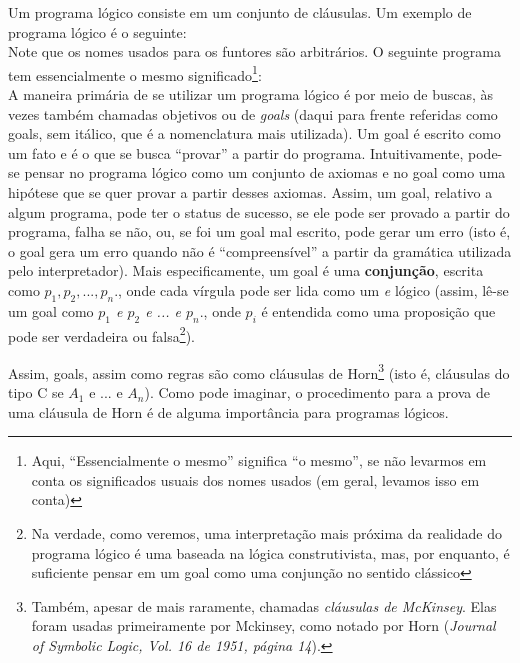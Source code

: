 \documentclass{article}
\theoremstyle{remark}
\begin{document}
Um programa lógico consiste em um conjunto de cláusulas. Um exemplo de programa lógico é o seguinte:\\



Note que os nomes usados para os funtores são arbitrários. O seguinte programa tem essencialmente o mesmo significado\footnote{ Aqui, ``Essencialmente o mesmo'' significa ``o mesmo'', se não levarmos em conta os significados usuais dos nomes usados (em geral, levamos isso em conta)}:\\




A maneira primária de se utilizar um programa lógico é por meio de buscas, às vezes também chamadas objetivos ou de \textit{goals} (daqui para frente referidas como goals, sem itálico, que é a nomenclatura mais utilizada). Um goal é escrito como um fato e é o que se busca ``provar'' a partir do programa. Intuitivamente, pode-se pensar no programa lógico como um conjunto de axiomas e no goal como uma hipótese que se quer provar a partir desses axiomas. Assim, um
goal, relativo a algum programa, pode ter o status de sucesso, se ele pode ser provado a partir do programa, falha se não, ou, se foi um goal mal escrito, pode gerar um erro (isto é, o goal gera um erro quando não é ``compreensível'' a partir da gramática utilizada pelo interpretador). Mais especificamente, um goal é uma \textbf{conjunção}, escrita como \textit{$p_1,p_2,...,p_n.$}, onde cada vírgula pode ser lida como um \textit{e} lógico (assim, lê-se um goal como \textit{$p_1$ e $p_2$ e ... e
  $p_n.$}, onde $p_i$ é
entendida como uma proposição que pode ser verdadeira ou falsa\footnote{Na verdade, como veremos, uma interpretação mais próxima da realidade do programa lógico é uma baseada na lógica construtivista, mas, por enquanto, é suficiente pensar em um goal como uma conjunção no sentido clássico}).

Assim, goals, assim como regras são como cláusulas de Horn\footnote{Também, apesar de mais raramente, chamadas \textit{cláusulas de McKinsey}. Elas foram usadas primeiramente por Mckinsey, como notado por Horn (\textit{Journal of Symbolic Logic, Vol. 16 de 1951, página 14}).} (isto é, cláusulas do tipo C se $A_1$ e ... e $A_n$). Como pode imaginar, o procedimento para a prova de uma cláusula de Horn é de alguma importância para programas lógicos.
\end{document}

